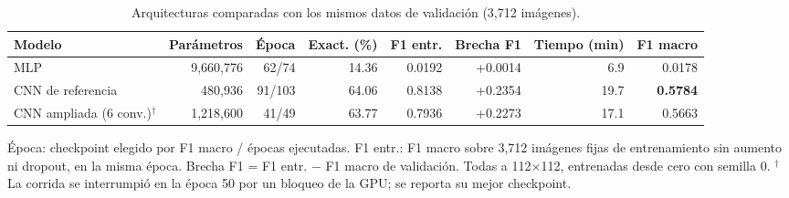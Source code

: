 \begin{table}[htbp]
\centering
\caption{Arquitecturas comparadas con los mismos datos de validación (3,712 imágenes).}
\label{tab:modelos}
\small
\begin{tabular}{lrrrrrrr}
\toprule
Modelo & Parámetros & Época & Exact. (\%) & F1 entr. & Brecha F1 & Tiempo (min) & F1 macro \\
\midrule
MLP & 9,660,776 & 62/74 & 14.36 & 0.0192 & +0.0014 & 6.9 & 0.0178 \\
CNN de referencia & 480,936 & 91/103 & 64.06 & 0.8138 & +0.2354 & 19.7 & \textbf{0.5784} \\
CNN ampliada (6 conv.)$^\dagger$ & 1,218,600 & 41/49 & 63.77 & 0.7936 & +0.2273 & 17.1 & 0.5663 \\
\bottomrule
\end{tabular}
\par\smallskip
\parbox{0.95\textwidth}{\footnotesize Época: checkpoint elegido por F1 macro / épocas ejecutadas. F1 entr.: F1 macro sobre 3,712 imágenes fijas de entrenamiento sin aumento ni dropout, en la misma época. Brecha F1 = F1 entr. $-$ F1 macro de validación. Todas a 112$\times$112, entrenadas desde cero con semilla 0. $^\dagger$La corrida se interrumpió en la época 50 por un bloqueo de la GPU; se reporta su mejor checkpoint.}
\end{table}
